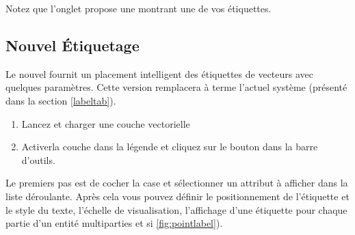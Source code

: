 Notez que l'onglet  propose une  montrant une de vos étiquettes.


\subsection{Nouvel Étiquetage}\label{newlabel}

Le nouvel  fournit un placement intelligent des étiquettes de vecteurs avec quelques paramètres. Cette version remplacera à terme l'actuel système (présenté dans la section \ref{labeltab}). 


\begin{enumerate}
  \item  Lancez \qg et charger une couche vectorielle
  \item Activerla couche dans la légende et cliquez sur le bouton  dans la barre d'outils.
\end{enumerate}


Le premiers pas est de cocher la case  et sélectionner un attribut à afficher dans la liste déroulante. Après cela vous pouvez définir le positionnement de l'étiquette et le style du texte, l'échelle de visualisation, l'affichage d'une étiquette pour chaque partie d'un entité multiparties et si \ref{fig:pointlabel}).

